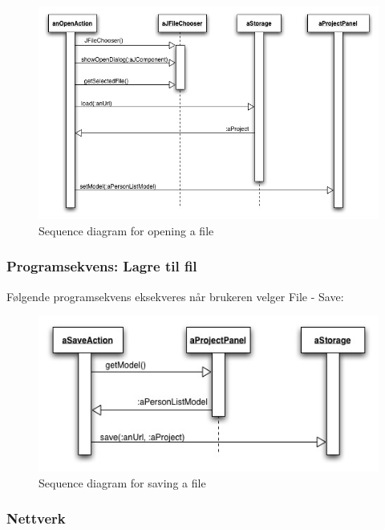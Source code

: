 \begin{figure}[H]
    \centering
    \includegraphics[width=\textwidth]{resources/sequence-open-file.jpg}
    \caption{Sequence diagram for opening a file}
    \label{fig:sequence-open-file}
\end{figure}

\subsubsection{Programsekvens: Lagre til fil}

Følgende programsekvens eksekveres når brukeren velger File - Save:

\begin{figure}[H]
    \centering
    \includegraphics[width=\textwidth]{resources/sequence-save-file.jpg}
    \caption{Sequence diagram for saving a file}
    \label{fig:sequence-save-file}
\end{figure}

\subsubsection{Nettverk}

